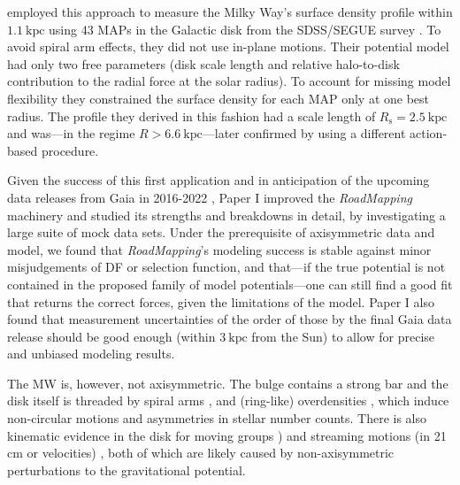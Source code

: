 \documentclass[iop,revtex4,numberedappendix,appendixfloats]{emulateapj}
\newcommand{\RM}{{\sl RoadMapping}}
\begin{document}
\citet{2013ApJ...779..115B} employed this approach to measure the Milky Way's surface density profile within $1.1~\text{kpc}$ using 43 MAPs in the Galactic disk from the SDSS/SEGUE survey \citep{2009AJ....137.4377Y}. To avoid spiral arm effects, they did not use in-plane motions. Their potential model had only two free parameters (disk scale length and relative halo-to-disk contribution to the radial force at the solar radius). To account for missing model flexibility they constrained the surface density for each MAP only at one best radius. The profile they derived in this fashion had a scale length of $R_\text{s}=2.5~\text{kpc}$ and was---in the regime $R>6.6~\text{kpc}$---later confirmed by \citet{2014MNRAS.445.3133P} using a different action-based procedure.

Given the success of this first application and in anticipation of the upcoming data releases from Gaia in 2016-2022 \citep{2013CEAB...37..115E}, Paper I improved the \RM{} machinery and studied its strengths and breakdowns in detail, by investigating a large suite of mock data sets. Under the prerequisite of axisymmetric data and model, we found that \RM{}'s modeling success is stable against minor misjudgements of DF or selection function, and that---if the true potential is not contained in the proposed family of model potentials---one can still find a good fit that returns the correct forces, given the limitations of the model. Paper I also found that measurement uncertainties of the order of those by the final Gaia data release should be good enough (within $3~\text{kpc}$ from the Sun) to allow for precise and unbiased modeling results. 

The MW is, however, not axisymmetric. The bulge contains a strong bar \citep{1980ApJ...236..779L,1991ApJ...379..631B,1991MNRAS.252..210B,1997MNRAS.288..365B,2000MNRAS.317L..45H,2013MNRAS.435.1874W} and the disk itself is threaded by spiral arms \citep{1958MNRAS.118..379O,1976A&A....49...57G,2009PASP..121..213C,2014ApJ...783..130R}, and (ring-like) overdensities \citep{2002ApJ...569..245N,2008ApJ...673..864J,2015ApJ...801..105X}, which induce non-circular motions and asymmetries in stellar number counts. There is also kinematic evidence in the disk for moving groups \citep{1998AJ....115.2384D,2005A&A...430..165F,2009ApJ...700.1794B,2010ApJ...717..617B}) and streaming motions (in 21 cm or velocities) \citep{2015ApJ...800...83B,2013MNRAS.436..101W,2012MNRAS.425.2335S}, both of which are likely caused by non-axisymmetric perturbations to the gravitational potential.
\end{document}
